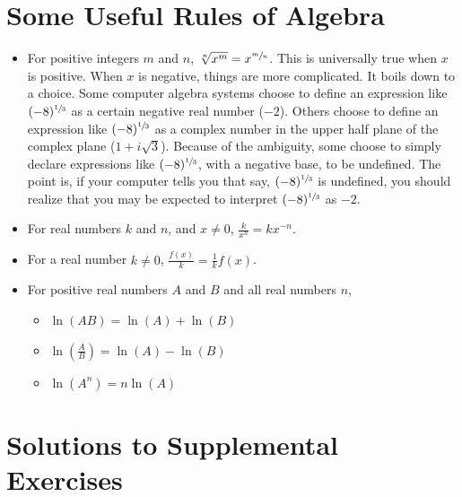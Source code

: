 \documentclass[10pt,oneside,]{book}
\theoremstyle{plain}
\theoremstyle{definition}
\numberwithin{equation}{section}
\newcommand{\fe}[2]{#1\mathopen{}\left(#2\right)\mathclose{}}
\begin{document}
\chapter[Some Useful Rules of Algebra]{Some Useful Rules of Algebra}\label{appendix-useful-algebra}
\begin{itemize}[label=\textbullet]
\item{}For positive integers \(m\) and \(n\), \(\sqrt[n]{x^m}=x^{\sfrac{m}{n}}\). This is universally true when \(x\) is positive. When \(x\) is negative, things are more complicated. It boils down to a choice. Some computer algebra systems choose to define an expression like \((-8)^{\sfrac{1}{3}}\) as a certain negative real number (\(-2\)). Others choose to define an expression like \((-8)^{\sfrac{1}{3}}\) as a complex number in the upper half plane of the complex plane (\(1+i\sqrt{3}\)). Because of the ambiguity, some choose to simply declare expressions like \((-8)^{\sfrac{1}{3}}\), with a negative base, to be undefined. The point is, if your computer tells you that say, \((-8)^{\sfrac{1}{3}}\) is undefined, you should realize that you may be expected to interpret \((-8)^{\sfrac{1}{3}}\) as \(-2\).\item{}For real numbers \(k\) and \(n\), and \(x\neq0\), \(\frac{k}{x^n}=kx^{-n}\).\item{}For a real number \(k\neq0\), \(\frac{\fe{f}{x}}{k}=\frac{1}{k}\fe{f}{x}\).\item{}For positive real numbers \(A\) and \(B\) and all real numbers \(n\), 
            \begin{itemize}[label=$\circ$]
\item{}\(\fe{\ln}{AB}=\fe{\ln}{A}+\fe{\ln}{B}\)\item{}\(\fe{\ln}{\frac{A}{B}}=\fe{\ln}{A}-\fe{\ln}{B}\)\item{}\(\fe{\ln}{A^n}=n\fe{\ln}{A}\)\end{itemize}

        \end{itemize}
%
\backmatter
%
\typeout{************************************************}
\typeout{************************************************}
\chapter[Solutions to Supplemental Exercises]{Solutions to Supplemental Exercises}\label{section-63}
\end{document}

